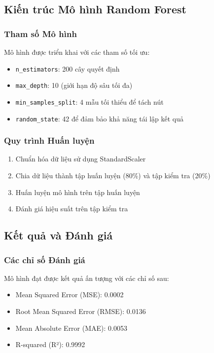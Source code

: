 \subsection{Kiến trúc Mô hình Random Forest}

\subsubsection{Tham số Mô hình}
Mô hình được triển khai với các tham số tối ưu:
\begin{itemize}
    \item \texttt{n\_estimators}: 200 cây quyết định
    \item \texttt{max\_depth}: 10 (giới hạn độ sâu tối đa)
    \item \texttt{min\_samples\_split}: 4 mẫu tối thiểu để tách nút
    \item \texttt{random\_state}: 42 để đảm bảo khả năng tái lập kết quả
\end{itemize}

\subsubsection{Quy trình Huấn luyện}
\begin{enumerate}
    \item Chuẩn hóa dữ liệu sử dụng StandardScaler
    \item Chia dữ liệu thành tập huấn luyện (80\%) và tập kiểm tra (20\%)
    \item Huấn luyện mô hình trên tập huấn luyện
    \item Đánh giá hiệu suất trên tập kiểm tra
\end{enumerate}

\subsection{Kết quả và Đánh giá}

\subsubsection{Các chỉ số Đánh giá}
Mô hình đạt được kết quả ấn tượng với các chỉ số sau:
\begin{itemize}
    \item Mean Squared Error (MSE): 0.0002
    \item Root Mean Squared Error (RMSE): 0.0136
    \item Mean Absolute Error (MAE): 0.0053
    \item R-squared (R²): 0.9992
\end{itemize}

